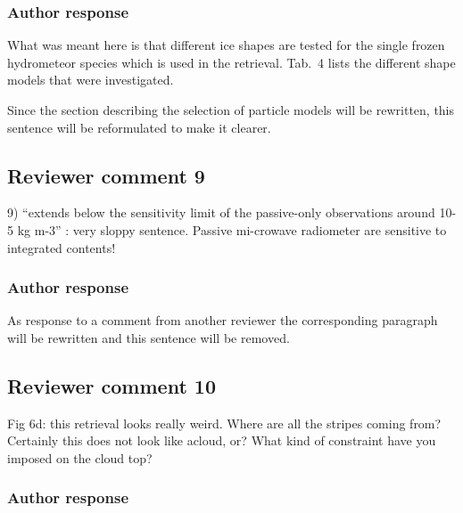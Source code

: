 \documentclass[11pt]{scrartcl}
\begin{document}
\subsubsection*{Author response}

What was meant here is that different ice shapes are tested for the single
frozen hydrometeor species which is used in the retrieval. Tab.~4 lists the
different shape models that were investigated.

Since the section describing the selection of particle models will be rewritten,
this sentence will be reformulated to make it clearer.

\subsection*{Reviewer comment 9}

9) “extends below the sensitivity limit of the passive-only observations around
10-5 kg m-3” : very sloppy sentence. Passive mi-crowave radiometer are sensitive
to integrated contents!

\subsubsection*{Author response}

As response to a comment from another reviewer the corresponding paragraph will be
rewritten and this sentence will be removed.



\subsection*{Reviewer comment 10}

 Fig 6d: this retrieval looks really weird. Where are all the stripes coming
 from? Certainly this does not look like acloud, or? What kind of constraint
 have you imposed on the cloud top?

\subsubsection*{Author response}
\end{document}
